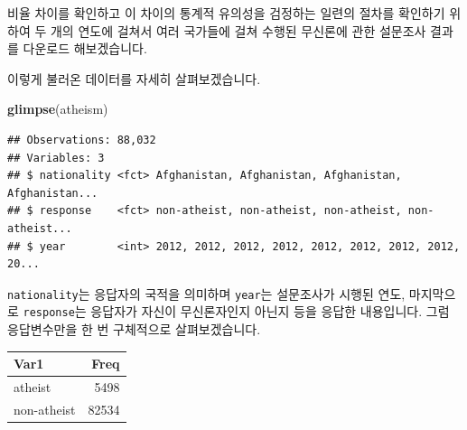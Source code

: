 \documentclass[]{book}
\newenvironment{Shaded}{\begin{snugshade}}{\end{snugshade}}
\newcommand{\DataTypeTok}[1]{\textcolor[rgb]{0.13,0.29,0.53}{#1}}
\newcommand{\KeywordTok}[1]{\textcolor[rgb]{0.13,0.29,0.53}{\textbf{#1}}}
\newcommand{\NormalTok}[1]{#1}
\newcommand{\OperatorTok}[1]{\textcolor[rgb]{0.81,0.36,0.00}{\textbf{#1}}}
\newcommand{\StringTok}[1]{\textcolor[rgb]{0.31,0.60,0.02}{#1}}
\begin{document}
비율 차이를 확인하고 이 차이의 통계적 유의성을 검정하는 일련의 절차를 확인하기 위하여 두 개의 연도에 걸쳐서 여러 국가들에 걸쳐 수행된 무신론에 관한 설문조사 결과를 다운로드 해보겠습니다.

\begin{Shaded}
\end{Shaded}

이렇게 불러온 데이터를 자세히 살펴보겠습니다.

\begin{Shaded}
\begin{Highlighting}[]
\KeywordTok{glimpse}\NormalTok{(atheism)}
\end{Highlighting}
\end{Shaded}

\begin{verbatim}
## Observations: 88,032
## Variables: 3
## $ nationality <fct> Afghanistan, Afghanistan, Afghanistan, Afghanistan...
## $ response    <fct> non-atheist, non-atheist, non-atheist, non-atheist...
## $ year        <int> 2012, 2012, 2012, 2012, 2012, 2012, 2012, 2012, 20...
\end{verbatim}

\texttt{nationality}는 응답자의 국적을 의미하며 \texttt{year}는 설문조사가 시행된 연도, 마지막으로 \texttt{response}는 응답자가 자신이 무신론자인지 아닌지 등을 응답한 내용입니다. 그럼 응답변수만을 한 번 구체적으로 살펴보겠습니다.

\begin{Shaded}
\end{Shaded}

\begin{tabular}{l|r}
\hline
Var1 & Freq\\
\hline
atheist & 5498\\
\hline
non-atheist & 82534\\
\hline
\end{tabular}
\end{document}
